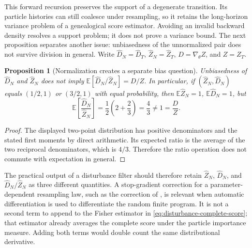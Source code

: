 \documentclass[11pt]{article}
\newtheorem{proposition}{Proposition}
\begin{document}
This forward recursion preserves the support of a degenerate transition.
Its particle histories can still coalesce under resampling, so it retains
the long-horizon variance problem of a genealogical score estimator.
Avoiding an invalid backward density resolves a support problem; it does not
prove a variance bound. The next proposition separates another issue:
unbiasedness of the unnormalized pair does not survive division in general.
Write $\widehat D_N=\widehat D_T$, $\widehat Z_N=\widehat Z_T$,
$D=\nabla_\theta Z$, and $Z=Z_T$.

\begin{proposition}[Normalization creates a separate bias question]
\label{prop:ratio-bias}
Unbiasedness of $\widehat D_N$ and $\widehat Z_N$ does not imply
$\mathbb E[\widehat D_N/\widehat Z_N]=D/Z$. In particular, if
$(\widehat Z_N,\widehat D_N)$ equals $(1/2,1)$ or $(3/2,1)$ with equal
probability, then $\mathbb E\widehat Z_N=1$, $\mathbb E\widehat D_N=1$, but
\begin{equation}
 \mathbb E\left[\frac{\widehat D_N}{\widehat Z_N}\right]
 =\frac12\left(2+\frac23\right)=\frac43\ne1
 =\frac{D}{Z}.
 \label{eq:ratio-bias-counterexample}
\end{equation}
\end{proposition}

\begin{proof}
The displayed two-point distribution has positive denominators and the stated
first moments by direct arithmetic. Its expected ratio is the average of the
two reciprocal denominators, which is $4/3$. Therefore the ratio operation
does not commute with expectation in general.
\end{proof}

The practical output of a disturbance filter should therefore retain
$\widehat Z_N$, $\widehat D_N$, and $\widehat D_N/\widehat Z_N$ as three
different quantities. A stop-gradient correction for a parameter-dependent
resampling law, such as the correction of
\citet[Section 3.1, equation (13)]{scibior2021dpf}, is relevant when automatic
differentiation is used to differentiate the random finite program. It is not
a second term to append to the Fisher estimator in
\eqref{eq:disturbance-complete-score}; that estimator already averages the
complete score under the particle importance measure. Adding both terms would
double count the same distributional derivative.
\end{document}
